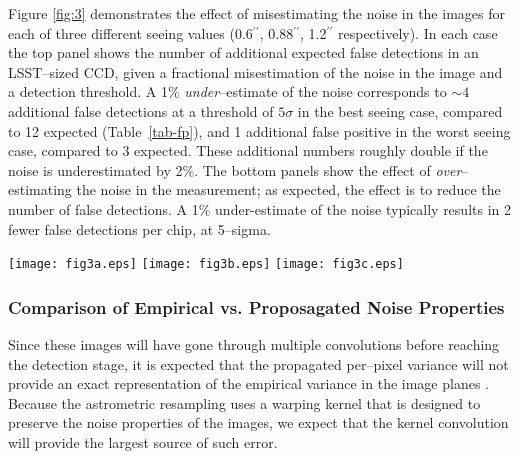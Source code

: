 \documentclass[iop]{emulateapj}
\begin{document}
Figure \ref{fig:3} demonstrates the effect of misestimating the noise in the images for each of three different seeing values (0.6$^{\prime\prime}$, 0.88$^{\prime\prime}$, 1.2$^{\prime\prime}$ respectively).
In each case the top panel shows the number of additional expected false detections in an LSST--sized CCD, given a fractional misestimation of the noise in the image and a detection threshold.
A 1\% {\it under}--estimate of the noise corresponds to $\sim 4$ additional false detections at a threshold of $5\sigma$ in the best seeing case, compared to 12 expected (Table~\ref{tab-fp}), and 1 additional false positive in the worst seeing case, compared to 3 expected.
These additional numbers roughly double if the noise is underestimated by 2\%.
The bottom panels show the effect of {\it over}--estimating the noise in the measurement; as expected, the effect is to reduce the number of false detections.
A 1\% under-estimate of the noise typically results in 2 fewer false detections per chip, at 5--sigma.
\begin{figure*}[!ht]
  \texttt{[image: fig3a.eps]}
  \texttt{[image: fig3b.eps]}
  \texttt{[image: fig3c.eps]} \\
  \caption[]{ We plot here the expected change in the total number of false detections as a function of detection threshold and noise misestimate.
    The panels are for three values of image seeing, left--to--right 0.6'', 0.88'', and 1.2''.
    In each panel the top pane shows the rate increase when the noise is under--estimated, and the bottom shows the rate decrease when the noise is over--estimated.
    In all cases the counts are for the total number of false detections in a single 4000x4072--pixel random Gaussian field.
  }
  \label{fig:3}
\end{figure*} 

\subsubsection{Comparison of Empirical vs. Proposagated Noise Properties}



Since these images will have gone through multiple convolutions before reaching the detection stage, it is expected that the propagated per--pixel variance will not provide an exact representation of the empirical variance in the image planes \citep{Price-Stacking}.
Because the astrometric resampling uses a warping kernel that is designed to preserve the noise properties of the images, we expect that the kernel convolution will provide the largest source of such error.
\end{document}
